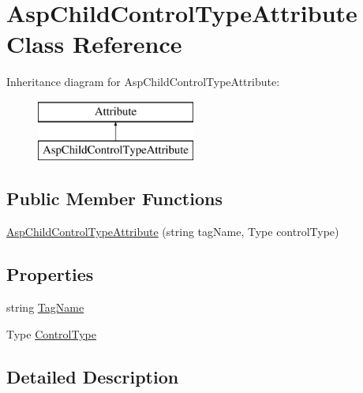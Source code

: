 \hypertarget{class_asp_child_control_type_attribute}{}\section{Asp\+Child\+Control\+Type\+Attribute Class Reference}
\label{class_asp_child_control_type_attribute}
Inheritance diagram for Asp\+Child\+Control\+Type\+Attribute\+:\begin{figure}[H]
\begin{center}
\leavevmode
\includegraphics[height=2.000000cm]{class_asp_child_control_type_attribute}
\end{center}
\end{figure}
\subsection*{Public Member Functions}
\begin{DoxyCompactItemize}
\item 
\hyperlink{class_asp_child_control_type_attribute_ad547dcf065ac2d1092f0cce82cc26fe7}{Asp\+Child\+Control\+Type\+Attribute} (string tag\+Name, Type control\+Type)
\end{DoxyCompactItemize}
\subsection*{Properties}
\begin{DoxyCompactItemize}
\item 
string \hyperlink{class_asp_child_control_type_attribute_a9e30613d70a3bcffb32a4664a5d121d2}{Tag\+Name}
\item 
Type \hyperlink{class_asp_child_control_type_attribute_a6c6421f394baa882056b2dfc3efcd284}{Control\+Type}
\end{DoxyCompactItemize}


\subsection{Detailed Description}


